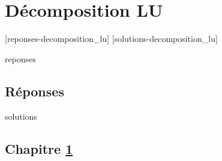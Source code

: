 \chapter{Décomposition LU}
\label{chap:decomposition}


[reponses-decomposition_lu]
[solutions-decomposition_lu]

\begin{Filesave}{reponses}
\bigskip
\section*{Réponses}

\end{Filesave}

\begin{Filesave}{solutions}
\section*{Chapitre \ref{chap:decomposition}}

\end{Filesave}


